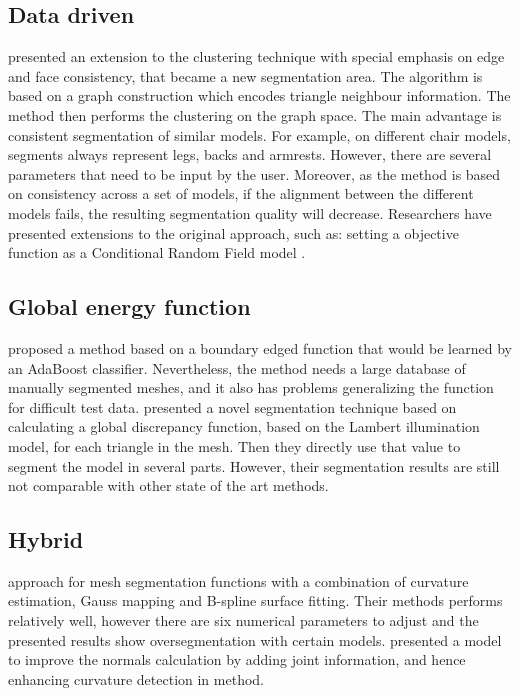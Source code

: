 \subsection{Data driven}

\cite{Golovinskiy2009} presented an extension to the clustering technique with special emphasis on edge and face consistency, that became a new segmentation area.
The algorithm is based on a graph construction which encodes triangle neighbour information.
The method then performs the clustering on the graph space.
The main advantage is consistent segmentation of similar models.
For example, on different chair models, segments always represent legs, backs and armrests. 
However, there are several parameters that need to be input by the user.
Moreover, as the method is based on consistency across a set of models, if the alignment between the different models fails, the resulting segmentation quality will decrease.
Researchers have presented extensions to the original \cite{Golovinskiy2009} approach, such as: setting a objective function as a Conditional Random Field model \cite{Kalogerakis2010}.

\subsection{Global energy function}

\cite{Benhabiles2011} proposed a method based on a boundary edged function that would be learned by an AdaBoost classifier.
Nevertheless, the method needs a large database of manually segmented meshes, and it also has problems generalizing the function for difficult test data.
\cite{DeCastro2014} presented a novel segmentation technique based on calculating a global discrepancy function, based on the Lambert illumination model, for each triangle in the mesh.
Then they directly use that value to segment the model in several parts.
However, their segmentation results are still not comparable with other state of the art methods.

\subsection{Hybrid}

\cite{Wang2011} approach for mesh segmentation functions with a combination of curvature estimation, Gauss mapping and B-spline surface fitting.
Their methods performs relatively well, however there are six numerical parameters to adjust and the presented results show oversegmentation with certain models.
\cite{Yang2014} presented a model to improve the normals calculation by adding joint information, and hence enhancing curvature detection in \cite{Wang2011} method.

